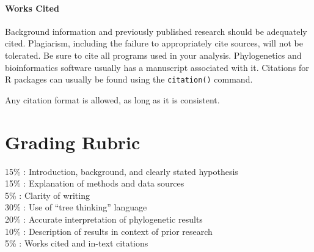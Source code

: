 \documentclass[12pt]{article}
\begin{document}
\paragraph{Works Cited}
Background information and previously published research should be adequately cited.
Plagiarism, including the failure to appropriately cite sources, will not be tolerated.
Be sure to cite all programs used in your analysis.  
Phylogenetics and bioinformatics software usually has a manuscript associated with it.
Citations for R packages can usually be found using the \verb+citation()+ command.

Any citation format is allowed, as long as it is consistent.


\section{Grading Rubric}

15\% : Introduction, background, and clearly stated hypothesis \\
15\% : Explanation of methods and data sources\\
5\% : Clarity of writing\\
30\% : Use of ``tree thinking'' language\\
20\% : Accurate interpretation of phylogenetic results\\
10\% : Description of results in context of prior research\\
5\% : Works cited and in-text citations\\
\end{document}
